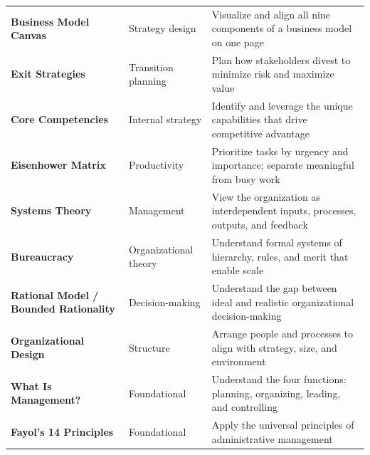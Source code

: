 \documentclass[11pt, letterpaper]{article}
\begin{document}
\begin{center}
\begin{tabular}{>{\bfseries}p{3.8cm} p{3cm} p{6.5cm}}
\addlinespace
Business Model Canvas & Strategy design & Visualize and align all nine components of a business model on one page \\
\addlinespace
Exit Strategies & Transition planning & Plan how stakeholders divest to minimize risk and maximize value \\
\addlinespace
Core Competencies & Internal strategy & Identify and leverage the unique capabilities that drive competitive advantage \\
\addlinespace
Eisenhower Matrix & Productivity & Prioritize tasks by urgency and importance; separate meaningful from busy work \\
\addlinespace
Systems Theory & Management & View the organization as interdependent inputs, processes, outputs, and feedback \\
\addlinespace
Bureaucracy & Organizational theory & Understand formal systems of hierarchy, rules, and merit that enable scale \\
\addlinespace
Rational Model / Bounded Rationality & Decision-making & Understand the gap between ideal and realistic organizational decision-making \\
\addlinespace
Organizational Design & Structure & Arrange people and processes to align with strategy, size, and environment \\
\addlinespace
What Is Management? & Foundational & Understand the four functions: planning, organizing, leading, and controlling \\
\addlinespace
Fayol's 14 Principles & Foundational & Apply the universal principles of administrative management \\
\bottomrule
\end{tabular}
\end{center}
\end{document}
